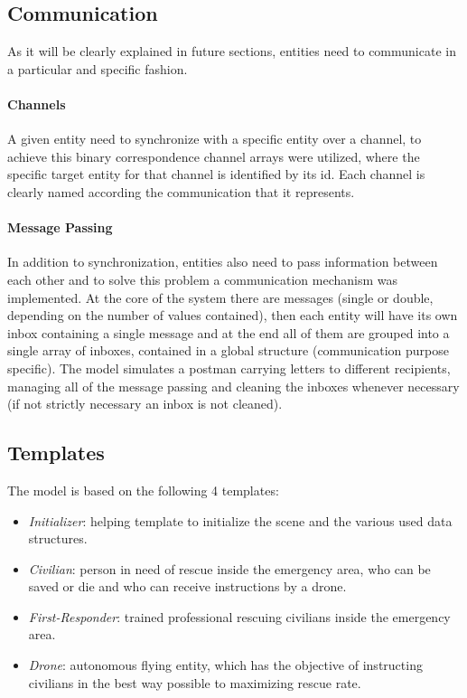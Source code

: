 \subsection{Communication}
As it will be clearly explained in future sections, entities need to communicate in a particular and specific fashion.
\paragraph{Channels}
A given entity need to synchronize with a specific entity over a channel, to achieve this binary correspondence channel arrays were utilized, where the specific target entity for that channel is identified by its id. Each channel is clearly named according the communication that it represents.
\paragraph{Message Passing}
In addition to synchronization, entities also need to pass information between each other and to solve this problem a communication mechanism was implemented. At the core of the system there are messages (single or double, depending on the number of values contained), then each entity will have its own inbox containing a single message and at the end all of them are grouped into a single array of inboxes, contained in a global structure (communication purpose specific). The model simulates a postman carrying letters to different recipients, managing all of the message passing and cleaning the inboxes whenever necessary (if not strictly necessary an inbox is not cleaned).


\subsection{Templates}
The model is based on the following 4 templates:
\begin{itemize}
	\item \textit{Initializer}: helping template to initialize the scene and the various used data structures.
	\item \textit{Civilian}: person in need of rescue inside the emergency area, who can be saved or die and who can receive instructions by a drone.
	\item \textit{First-Responder}: trained professional rescuing civilians inside the emergency area.
	\item \textit{Drone}: autonomous flying entity, which has the objective of instructing civilians in the best way possible to maximizing rescue rate.
\end{itemize}


